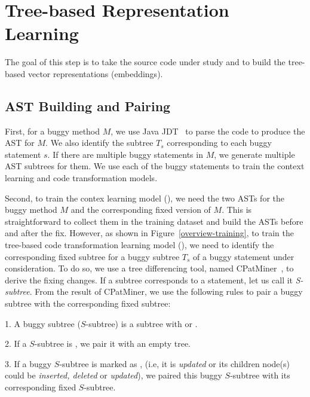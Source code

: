 \section{Tree-based Representation Learning}


The goal of this step is to take the source code under study and to
build the tree-based vector representations (embeddings).

\subsection{AST Building and Pairing}

First, for a buggy method $M$, we use Java JDT~\cite{JDT} to parse the
code to produce the AST for $M$. We also identify the subtree $T_s$
corresponding to each buggy statement $s$. If there are multiple buggy
statements in $M$, we generate multiple AST subtrees for them.
We use each of the buggy statements to train the context learning
and code transformation models.

Second, to train the contex learning model (), we need the
two ASTs for the buggy method $M$ and the corresponding fixed version
of $M$. This is straightforward to collect them in the training
dataset and build the ASTs before and after the fix.  However, as
shown in Figure~\ref{overview-training}, to train the tree-based code
transformation learning model (), we need to identify the
corresponding fixed subtree for a buggy subtree $T_s$ of a buggy
statement under consideration. To do so, we use a tree differencing
tool, named CPatMiner~\cite{nguyen2019graph}, to derive the fixing
changes. If a subtree corresponds to a statement, let us call it {\em
  S-subtree}. From the result of CPatMiner, we use the following rules
to pair a buggy subtree with the corresponding fixed subtree:

1. A buggy subtree ($S$-subtree) is a subtree with
 or .

2. If a $S$-subtree is , we pair it with an empty tree.

3. If a buggy $S$-subtree is marked as , (i.e, it is
{\em updated} or its children node(s) could be {\em inserted, deleted} or {\em
  updated}), we paired this buggy $S$-subtree with its corresponding
fixed $S$-subtree.

